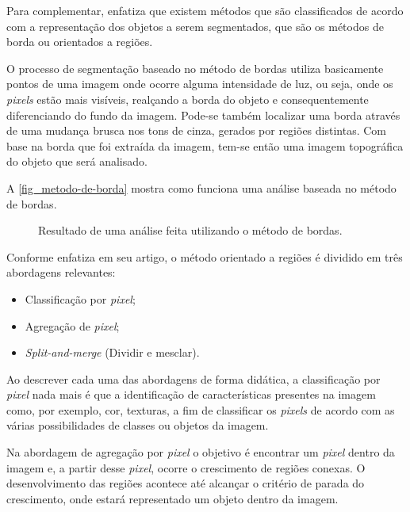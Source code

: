 Para complementar,  enfatiza que existem métodos que são classificados de acordo com a representação dos objetos a serem segmentados, que são os métodos de borda ou orientados a regiões.

O processo de segmentação baseado no método de bordas utiliza basicamente pontos de uma imagem onde ocorre alguma intensidade de luz, ou seja, onde os \textit{pixels} estão mais visíveis, realçando a borda do objeto e consequentemente diferenciando do fundo da imagem. Pode-se também localizar uma borda através de uma mudança brusca nos tons de cinza, gerados por regiões distintas. Com base na borda que foi extraída da imagem, tem-se então uma imagem topográfica do objeto que será analisado.

A \autoref{fig_metodo-de-borda} mostra como funciona uma análise baseada no método de bordas.

\clearpage

\begin{figure}[h]
	\caption{\label{fig_metodo-de-borda}Resultado de uma análise feita utilizando o método de bordas.}
	\begin{center}
	\end{center}
	\centering {}
\end{figure}

Conforme  enfatiza em seu artigo, o método orientado a regiões é dividido em três abordagens relevantes:

\begin{itemize}
   \item Classificação por \textit{pixel};
   \item Agregação de \textit{pixel};
   \item \textit{Split-and-merge} (Dividir e mesclar).
 \end{itemize}

Ao descrever cada uma das abordagens de forma didática, a classificação por \textit{pixel} nada mais é que a identificação de características presentes na imagem como, por exemplo, cor, texturas, a fim de classificar os \textit{pixels} de acordo com as várias possibilidades de classes ou objetos da imagem.

Na abordagem de agregação por \textit{pixel} o objetivo é encontrar um \textit{pixel} dentro da imagem e, a partir desse \textit{pixel}, ocorre o crescimento de regiões conexas. O desenvolvimento das regiões acontece até alcançar o critério de parada do crescimento, onde estará representado um objeto dentro da imagem.


